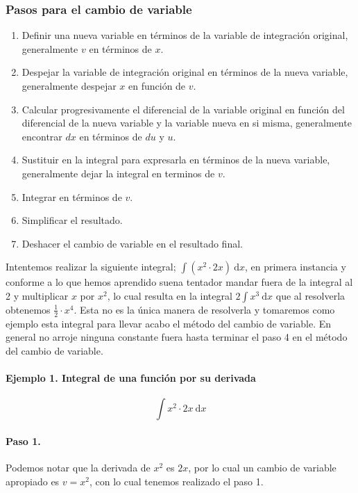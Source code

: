 \documentclass[11pt,letterpaper,oneside]{book}
\numberwithin{equation}{section}
\newcommand{\inti}[2]{\int #1 \text{d}#2}
\begin{document}
	\subsubsection{Pasos para el cambio de variable}
	\begin{enumerate}
		\item Definir una nueva variable en términos de la variable de integración original, generalmente $v$ en términos de $x$.
		\item Despejar la variable de integración original en términos de la nueva variable, generalmente despejar $x$ en función de $v$.
		\item Calcular progresivamente el diferencial de la variable original en función del diferencial de la nueva variable y la variable nueva en si misma, generalmente encontrar $dx$ en términos de $du$ y $u$.
		\item Sustituir en la integral para expresarla en términos de la nueva variable, generalmente dejar la integral en terminos de $v$.
		\item Integrar en términos de $v$.
		\item Simplificar el resultado.
		\item Deshacer el cambio de variable en el resultado final.
	\end{enumerate}
	
	\par Intentemos realizar la siguiente integral; $\inti{(x^2\cdot 2x)\ }{x}$, en primera instancia y conforme a lo que hemos aprendido suena tentador mandar fuera de la integral al 2 y multiplicar $x$ por $x^2$, lo cual resulta en la integral $2\inti{x^3\ }{x}$ que al resolverla obtenemos $\frac{1}{2} \cdot x^4$. Esta no es la única manera de resolverla y tomaremos como ejemplo esta integral para llevar acabo el método del cambio de variable. En general no arroje ninguna constante fuera hasta terminar el paso 4 en el método del cambio de variable.
	\paragraph{Ejemplo 1. Integral de una función por su derivada}
	\begin{equation*}
		\inti{x^2\cdot 2x\ }{x}
	\end{equation*}	
	\paragraph{Paso 1.} Podemos notar que la derivada de $x^2$ es $2x$, por lo cual un cambio de variable apropiado es $v=x^2$, con lo cual tenemos realizado el paso 1.
\end{document}

